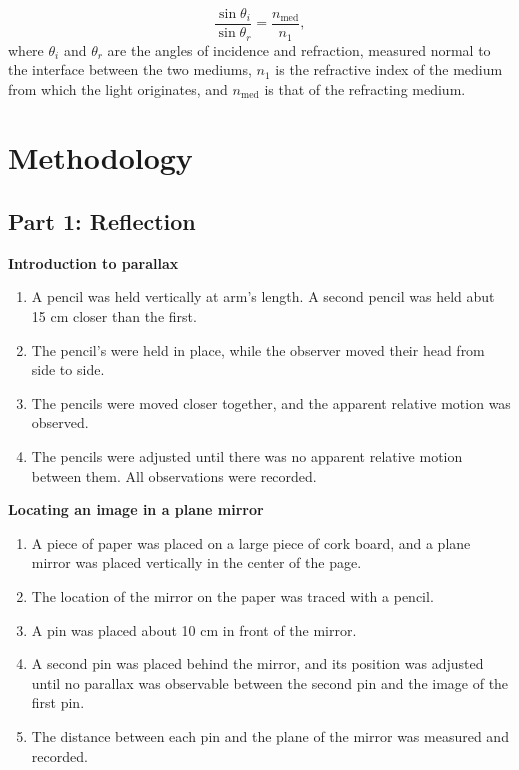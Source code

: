 \documentclass[twocolumn,english]{IEEEtran}
\theoremstyle{plain}
\theoremstyle{plain}
\begin{document}
\begin{equation}
	\frac{\sin\theta_i}{\sin\theta_r} = \frac{n_{\text{med}}}{n_1},
\end{equation}
where $\theta_i$ and $\theta_r$ are the angles of incidence and refraction, measured normal to the interface between the two mediums, $n_1$ is the refractive index of the medium from which the light originates, and $n_{\text{med}}$ is that of the refracting medium.





\section{Methodology}

\subsection*{Part 1: Reflection}

\textbf{Introduction to parallax}
\begin{enumerate}
 \item A pencil was held vertically at arm's length. A second pencil was held abut 15 cm closer than the first.
 \item The pencil's were held in place, while the observer moved their head from side to side.
 \item The pencils were moved closer together, and the apparent relative motion was observed.
 \item The pencils were adjusted until there was no apparent relative motion between them. All observations were recorded.
\end{enumerate}

\textbf{Locating an image in a plane mirror}
\begin{enumerate}
 \item A piece of paper was placed on a large piece of cork board, and a plane mirror was placed vertically in the center of the page.
 \item The location of the mirror on the paper was traced with a pencil.
 \item A pin was placed about 10 cm in front of the mirror.
 \item A second pin was placed behind the mirror, and its position was adjusted until no parallax was observable between the second pin and the image of the first pin.
 \item The distance between each pin and the plane of the mirror was measured and recorded.
\end{enumerate}
\end{document}
